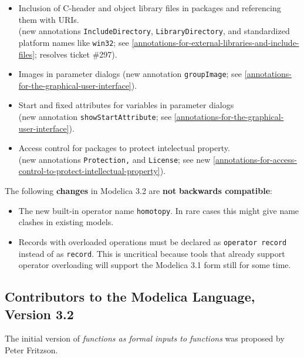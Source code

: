 \begin{itemize}
  \begin{itemize}
  \item
    Inclusion of C-header and object library files in packages and
    referencing them with URIs.\\
    (new annotations \lstinline!IncludeDirectory!, \lstinline!LibraryDirectory!, and
    standardized platform names like \lstinline!win32!; see \autoref{annotations-for-external-libraries-and-include-files}; resolves
    ticket \#297).
  \item
    Images in parameter dialogs (new annotation \lstinline!groupImage!; see
    \autoref{annotations-for-the-graphical-user-interface}).
  \item
    Start and fixed attributes for variables in parameter dialogs\\
    (new annotation \lstinline!showStartAttribute!; see \autoref{annotations-for-the-graphical-user-interface}).
  \item
    Access control for packages to protect intelectual property.\\
    (new annotations \lstinline!Protection,! and \lstinline!License!; see new \autoref{annotations-for-access-control-to-protect-intellectual-property}).
  \end{itemize}
\end{itemize}

The following \textbf{changes} in Modelica 3.2 are \textbf{not}
\textbf{backwards compatible}:

\begin{itemize}
\item
  The new built-in operator name \lstinline!homotopy!. In rare cases this might
  give name clashes in existing models.
\item
  Records with overloaded operations must be declared as \lstinline!operator record! instead of as \lstinline!record!. This is uncritical because tools
  that already support operator overloading will support the Modelica
  3.1 form still for some time.
\end{itemize}

\subsection{Contributors to the Modelica Language, Version 3.2}

The initial version of \emph{functions as formal inputs to functions} was
proposed by Peter Fritzson.

